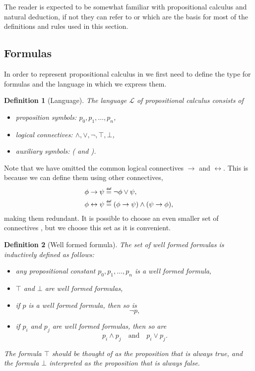 \documentclass[titlepage]{article}
\newcommand\myeq{\mathrel{\overset{\makebox[0pt]{\mbox{\normalfont\tiny\sffamily def}}}{=}}}
\newtheorem{definition}{Definition}[section]
\begin{document}
The reader is expected to be somewhat familiar with propositional calculus and natural deduction, if not they can refer to \cite{carlstrom} or \cite{vanDalen} which are the basis for most of the definitions and rules used in this section.



\subsection{Formulas}

In order to represent propositional calculus in \Agda we first need to define the type for formulas and the language in which we express them.

\begin{definition}[Language]\label{language}
    The language $\mathcal{L}$ of propositional calculus consists of
    \begin{itemize}
        \item proposition symbols: $p_0,p_1,\hdots,p_n$,
        \item logical connectives: $\wedge,\vee,\neg,\top,\bot$,
        \item auxiliary symbols: ( and ).
    \end{itemize}
\end{definition}
Note that we have omitted the common logical connectives $\rightarrow$ and $\leftrightarrow$. This is because we can define them using other connectives, 
\begin{align*}
    \phi \rightarrow \psi &\myeq \neg \phi \vee \psi, \\
    \phi \leftrightarrow \psi &\myeq (\phi \rightarrow \psi) \wedge (\psi \rightarrow \phi),
\end{align*}
making them redundant. It is possible to choose an even smaller set of connectives \cite{vanDalen}, but we choose this set as it is convenient.

\begin{definition}[Well formed formula]\label{wellformed}
    The set of well formed formulas is inductively defined as follows:
    \begin{itemize}
        \item any propositional constant $p_0,p_1,\hdots,p_n$ is a well formed formula,
        \item $\top$ and $\bot$ are well formed formulas,
        \item if $p$ is a well formed formula, then so is
        $$\neg p,$$
        \item if $p_i$ and $p_j$ are well formed formulas, then so are
            $$p_i \wedge p_j \quad \text{and} \quad p_i \vee p_j.$$
    \end{itemize}
    The formula $\top$ should be thought of as the proposition that is always true, and the formula $\bot$ interpreted as the proposition that is always false.
\end{definition}
\end{document}
